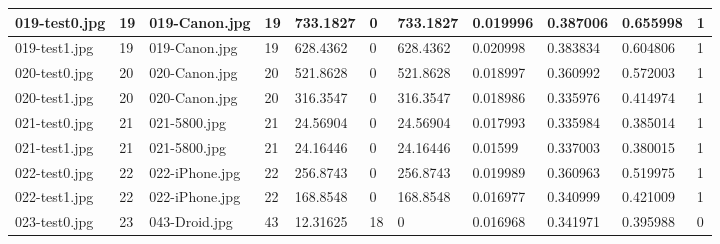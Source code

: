 \begin{landscape}
\begin{longtable}{|p{2cm}|p{1cm}|p{2cm}|p{1cm}|p{2cm}|p{1cm}|p{2cm}|p{2cm}|p{2cm}|p{2cm}|p{1cm}|}
	019-test0.jpg   & 19               & 019-Canon.jpg         & 19                          & 733.1827              & 0                       & 733.1827                   & 0.019996              & 0.387006              & 0.655998                 & 1                \\ \hline
	019-test1.jpg   & 19               & 019-Canon.jpg         & 19                          & 628.4362              & 0                       & 628.4362                   & 0.020998              & 0.383834              & 0.604806                 & 1                \\ \hline
	020-test0.jpg   & 20               & 020-Canon.jpg         & 20                          & 521.8628              & 0                       & 521.8628                   & 0.018997              & 0.360992              & 0.572003                 & 1                \\ \hline
	020-test1.jpg   & 20               & 020-Canon.jpg         & 20                          & 316.3547              & 0                       & 316.3547                   & 0.018986              & 0.335976              & 0.414974                 & 1                \\ \hline
	021-test0.jpg   & 21               & 021-5800.jpg          & 21                          & 24.56904              & 0                       & 24.56904                   & 0.017993              & 0.335984              & 0.385014                 & 1                \\ \hline
	021-test1.jpg   & 21               & 021-5800.jpg          & 21                          & 24.16446              & 0                       & 24.16446                   & 0.01599               & 0.337003              & 0.380015                 & 1                \\ \hline
	022-test0.jpg   & 22               & 022-iPhone.jpg        & 22                          & 256.8743              & 0                       & 256.8743                   & 0.019989              & 0.360963              & 0.519975                 & 1                \\ \hline
	022-test1.jpg   & 22               & 022-iPhone.jpg        & 22                          & 168.8548              & 0                       & 168.8548                   & 0.016977              & 0.340999              & 0.421009                 & 1                \\ \hline
	023-test0.jpg   & 23               & 043-Droid.jpg         & 43                          & 12.31625              & 18                      & 0                          & 0.016968              & 0.341971              & 0.395988                 & 0                \\ \hline

\end{longtable}
\end{landscape}
